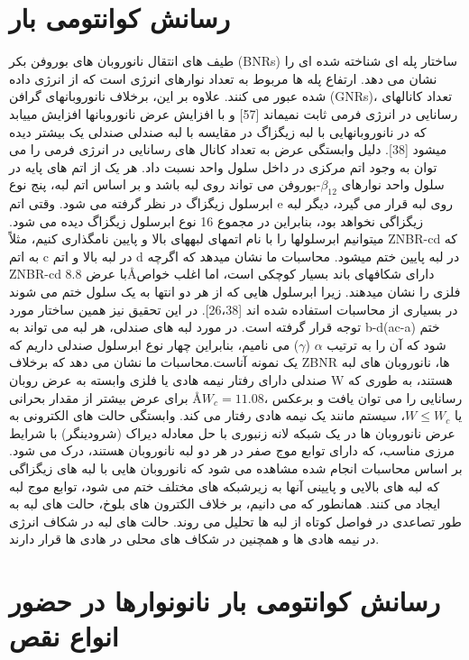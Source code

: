 \section{رسانش کوانتومی بار}
طیف های انتقال نانوروبان های بوروفن بکر (BNRs) ساختار پله ای شناخته شده ای را نشان می دهد. ارتفاع پله ها مربوط به تعداد نوارهای انرژی است که از انرژی داده شده عبور می کنند. علاوه بر این، برخلاف نانوروبانهای گرافن (GNRs)، تعداد کانالهای رسانایی در انرژی فرمی ثابت نمیماند [57] و با افزایش عرض نانوروبانها افزایش مییابد که در نانوروبانهایی با لبه زیگزاگ در مقایسه با لبه صندلی صندلی یک بیشتر دیده میشود [38]. دلیل وابستگی عرض به تعداد کانال های رسانایی در انرژی فرمی را می توان به وجود اتم مرکزی در داخل سلول واحد نسبت داد. هر یک از اتم های پایه در سلول واحد نوارهای $\beta_{12}$-بوروفن می تواند روی لبه باشد و بر اساس اتم لبه، پنج نوع ابرسلول زیگزاگ در نظر گرفته می شود. وقتی اتم e روی لبه قرار می گیرد، دیگر لبه زیگزاگی نخواهد بود، بنابراین در مجموع 16 نوع ابرسلول زیگزاگ دیده می شود. میتوانیم ابرسلولها را با نام اتمهای لبههای بالا و پایین نامگذاری کنیم، مثلاً ZNBR-cd که به اتم c در لبه بالا و اتم d در لبه پایین ختم میشود. محاسبات ما نشان میدهد که اگرچه ZNBR-cd با عرض 8.8\AA دارای شکافهای باند بسیار کوچکی است، اما اغلب خواص فلزی را نشان میدهند. زیرا ابرسلول هایی که از هر دو انتها به یک سلول ختم می شوند در بسیاری از محاسبات استفاده شده اند [26،38]. در این تحقیق نیز همین ساختار مورد توجه قرار گرفته است. در مورد لبه های صندلی، هر لبه می تواند به b-d(ac-a) ختم شود که آن را به ترتیب $\alpha$ ($\gamma$) می نامیم، بنابراین چهار نوع ابرسلول صندلی داریم که یک نمونه آناست.محاسبات ما نشان می دهد که برخلاف ZBNR ها، نانوروبان های لبه صندلی دارای رفتار نیمه هادی یا فلزی وابسته به عرض روبان W هستند، به طوری که برای عرض بیشتر از مقدار بحرانی \AA $W_c = 11.08$، رسانایی را می توان یافت و برعکس یا $W\leq W_c$، سیستم مانند یک نیمه هادی رفتار می کند. وابستگی حالت های الکترونی به عرض نانوروبان ها در یک شبکه لانه زنبوری با حل معادله دیراک (شرودینگر) با شرایط مرزی مناسب، که دارای توابع موج صفر در هر دو لبه نانوروبان هستند، درک می شود. بر اساس محاسبات انجام شده مشاهده می شود که نانوروبان هایی با لبه های زیگزاگی که لبه های بالایی و پایینی آنها به زیرشبکه های مختلف ختم می شود، توابع موج لبه ایجاد می کنند. همانطور که می دانیم، بر خلاف الکترون های بلوخ، حالت های لبه به طور تصاعدی در فواصل کوتاه از لبه ها تحلیل می روند. حالت های لبه در شکاف انرژی در نیمه هادی ها و همچنین در شکاف های محلی در هادی ها قرار دارند.

\section{رسانش کوانتومی بار نانونوارها در حضور انواع نقص}

